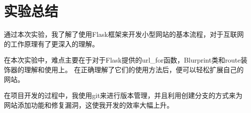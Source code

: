 \section{实验总结}
通过本次实验，我了解了使用Flask框架来开发小型网站的基本流程，对于互联网的工作原理有了更深入的理解。

在本次实验中，难点主要在于对于Flask提供的url\_for函数，Blurprint类和route装饰器的理解和使用上。
在正确理解了它们的使用方法后，便可以轻松扩展自己的网站。

在项目开发的过程中，我使用git来进行版本管理，并且利用创建分支的方式来为网站添加功能和修复漏洞，这使我开发的效率大幅上升。
